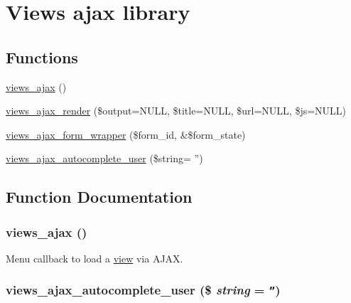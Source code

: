 \hypertarget{group__ajax}{
\section{Views ajax library}
\label{group__ajax}
}
\subsection*{Functions}
\begin{CompactItemize}
\item 
\hyperlink{group__ajax_g5f1adff7f07ea45d8ab62b456ffdd6e0}{views\_\-ajax} ()
\item 
\hyperlink{group__ajax_gb8d3fb5832b13ebecfc2367a923ea01d}{views\_\-ajax\_\-render} (\$output=NULL, \$title=NULL, \$url=NULL, \$js=NULL)
\item 
\hyperlink{group__ajax_g7eed0d665d7b4c8c8134eb060afbb2be}{views\_\-ajax\_\-form\_\-wrapper} (\$form\_\-id, \&\$form\_\-state)
\item 
\hyperlink{group__ajax_g0d9404f1a04f9f5102ffac0bef92d5ab}{views\_\-ajax\_\-autocomplete\_\-user} (\$string= '')
\end{CompactItemize}


\subsection{Function Documentation}
\hypertarget{group__ajax_g5f1adff7f07ea45d8ab62b456ffdd6e0}{
\subsubsection[{views\_\-ajax}]{\setlength{\rightskip}{0pt plus 5cm}views\_\-ajax ()}}
\label{group__ajax_g5f1adff7f07ea45d8ab62b456ffdd6e0}


Menu callback to load a \hyperlink{classview}{view} via AJAX. \hypertarget{group__ajax_g0d9404f1a04f9f5102ffac0bef92d5ab}{
\subsubsection[{views\_\-ajax\_\-autocomplete\_\-user}]{\setlength{\rightskip}{0pt plus 5cm}views\_\-ajax\_\-autocomplete\_\-user (\$ {\em string} = {\tt ''})}}
\label{group__ajax_g0d9404f1a04f9f5102ffac0bef92d5ab}


